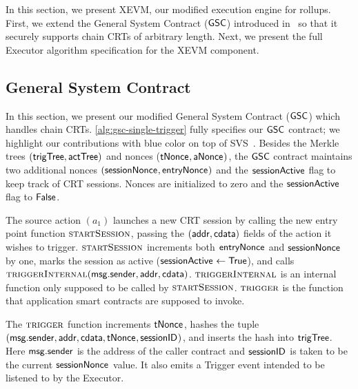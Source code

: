 \newcommand{\startsession}{\textproc{startSession}}
\newcommand{\checksessionid}{\textproc{checkSessionID}}
\newcommand{\trigger}{\textproc{trigger}}
\newcommand{\triggerinternal}{\textproc{triggerInternal}}
\newcommand{\action}{\textproc{action}}

In this section, we present XEVM, our modified execution engine for rollups. First, we extend the General System Contract ($\mathsf{GSC}$) introduced in~\cite{shared-val-seq-23} so that it securely supports chain CRTs of arbitrary length. Next, we present the full Executor algorithm specification for the XEVM component. 


\subsection{General System Contract}





 In this section, we present our modified General System Contract ($\mathsf{GSC}$) which handles chain CRTs. \cref{alg:gsc-single-trigger} fully specifies our $\mathsf{GSC}$ contract; we highlight our contributions with \textcolor{chain}{blue color} on top of SVS~\cite{shared-val-seq-23}. Besides the Merkle trees $(\mathsf{trigTree}, \mathsf{actTree})$ and nonces ($\mathsf{tNonce_{}}, \mathsf{aNonce_{}})$, the $\mathsf{GSC}$ contract maintains two additional nonces $(\mathsf{sessionNonce_{}}, \mathsf{entryNonce_{}})$ and the $\mathsf{sessionActive_{}}$ flag to keep track of CRT sessions. Nonces are initialized to zero and the $\mathsf{sessionActive_{}}$ flag to $\mathsf{False}$.

The source action $(a_1)$ launches a new CRT session by calling the new entry point function $\startsession$, passing the $(\mathsf{addr}, \mathsf{cdata})$ fields of the action it wishes to trigger. $\startsession$ increments both $\mathsf{entryNonce_{}}$ and $\mathsf{sessionNonce_{}}$ by one, marks the session as active ($\mathsf{sessionActive_{}} \gets \mathsf{True}$), and calls $\triggerinternal(\msgsender, \addr, \cdata)$. $\triggerinternal$ is an internal function only supposed to be called by $\startsession$. 
$\trigger$ is the function that application smart contracts are supposed to invoke.   


The $\trigger$ function increments $\mathsf{tNonce_{}}$, hashes the tuple $(\mathsf{msg.sender}, \mathsf{addr}{}, \mathsf{cdata}, \mathsf{tNonce_{}}, \mathsf{sessionID_{}})$, and inserts the hash into $\mathsf{trigTree}$. Here $\mathsf{msg.sender}$ is the address of the caller contract and $\mathsf{sessionID_{}}$ is taken to be the current $\mathsf{sessionNonce_{}}$ value. It also emits a Trigger event intended to be listened to by the Executor.  

